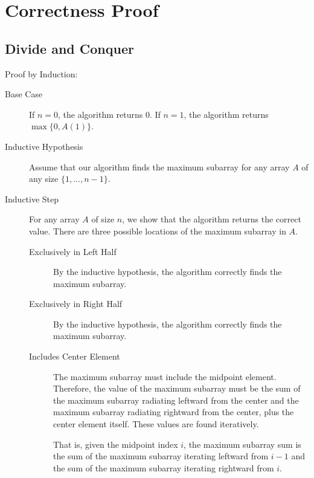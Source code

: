 \documentclass[12pt,letterpaper]{article}
\begin{document}
\section{Correctness Proof}
\subsection{Divide and Conquer}
Proof by Induction:
\begin{description}
  \item[Base Case] If $n=0$, the algorithm returns $0$. If $n=1$, the algorithm
    returns $\max \{ 0, A(1) \}$.
  \item[Inductive Hypothesis] Assume that our algorithm finds the maximum
    subarray for any array $A$ of any size $\{1,\ldots,n-1\}$.
  \item[Inductive Step] For any array $A$ of size $n$, we show that the
    algorithm returns the correct value. There are three possible locations of
    the maximum subarray in $A$.

    \begin{description}
      \item[Exclusively in Left Half] By the inductive hypothesis, the algorithm
        correctly finds the maximum subarray.
      \item[Exclusively in Right Half] By the inductive hypothesis, the algorithm
        correctly finds the maximum subarray.
      \item[Includes Center Element] The maximum subarray must include the
        midpoint element. Therefore, the value of the maximum subarray must be
        the sum of the maximum subarray radiating leftward from the center and
        the maximum subarray radiating rightward from the center, plus the
        center element itself. These values are found iteratively.

        That is, given the midpoint index $i$, the maximum subarray sum is the
        sum of the maximum subarray iterating leftward from $i-1$ and the
        sum of the maximum subarray iterating rightward from $i$.
    \end{description}
\end{description}
\end{document}
